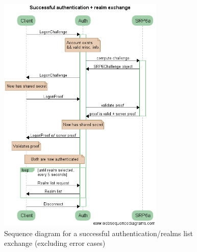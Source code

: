 \documentclass[paper=a4, fontsize=11pt]{scrartcl}
\begin{document}
\begin{figure}[htb!]
    \centering
    \includegraphics[width=0.7\textwidth]{authexch}
    \caption{Sequence diagram for a successful authentication/realms list
    exchange (excluding error cases)}
\end{figure}
\end{document}
